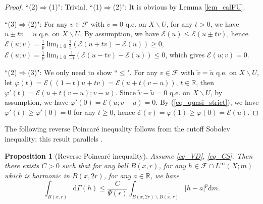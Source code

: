\documentclass[11pt,a4paper]{article}
\numberwithin{equation}{section}
\theoremstyle{plain}
\newtheorem{proposition}[theorem]{Proposition}
\theoremstyle{definition}
\begin{document}
\begin{proof}
``(2)$\Rightarrow$(1)": Trivial. ``(1)$\Rightarrow$(2)": It is obvious by Lemma \ref{lem_calFU}.

``(3)$\Rightarrow$(2)": For any $v\in\mathcal{F}$ with $\widetilde{v}=0$ q.e. on $X\backslash U$, for any $t>0$, we have $\widetilde{u}\pm t\widetilde{v}=\widetilde{u}$ q.e. on $X\backslash U$. By assumption, we have $\mathcal{E}(u)\le\mathcal{E}(u\pm tv)$, hence $\mathcal{E}(u;v)=\frac{1}{p}\lim_{t\downarrow0}\frac{1}{t}(\mathcal{E}(u+tv)-\mathcal{E}(u))\ge0$, $\mathcal{E}(u;v)=\frac{1}{p}\lim_{t\downarrow0}\frac{1}{-t}(\mathcal{E}(u-tv)-\mathcal{E}(u))\le0$, which gives $\mathcal{E}(u;v)=0$.

``(2)$\Rightarrow$(3)": We only need to show ``$\le$". For any $v\in\mathcal{F}$ with $\widetilde{v}=\widetilde{u}$ q.e. on $X\backslash U$, let $\varphi(t)=\mathcal{E}((1-t)u+tv)=\mathcal{E}(u+t(v-u))$, $t\in\mathbb{R}$, then $\varphi'(t)=\mathcal{E}(u+t(v-u);v-u)$. Since $\widetilde{v}-\widetilde{u}=0$ q.e. on $X\backslash U$, by assumption, we have $\varphi'(0)=\mathcal{E}(u;v-u)=0$. By (\ref{eq_quasi_strict}), we have $\varphi'(t)\ge\varphi'(0)=0$ for any $t\ge0$, hence $\mathcal{E}(v)=\varphi(1)\ge\varphi(0)=\mathcal{E}(u)$.
\end{proof}

The following reverse Poincar\'e inequality follows from the cutoff Sobolev inequality; this result parallels \cite[LEMMA 3.3]{KM20}.

\begin{proposition}[Reverse Poincar\'e inequality]\label{prop_PI_reverse}
Assume \ref{eq_VD}, \ref{eq_CS}. Then there exists $C>0$ such that for any ball $B(x,r)$, for any $h\in\mathcal{F}\cap L^\infty(X;m)$ which is harmonic in $B(x,2r)$, for any $a\in\mathbb{R}$, we have
$$\int_{B(x,r)}\mathrm{d}\Gamma(h)\le \frac{C}{\Psi(r)}\int_{B(x,2r)\backslash\overline{B(x,r)}}|h-a|^p\mathrm{d} m.$$
\end{proposition}
\end{document}

